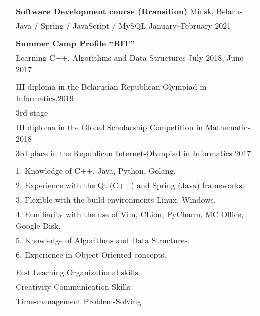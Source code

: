 \documentclass[letterpaper, 11pt]{article}
\begin{document}
\begin{longtable}{p{1.3in}p{4.8in}}
{\color{OliveGreen}{Additional}}
& \textbf{Software Development course (Itransition)} \hfill Minsk, Belarus\\
{\color{OliveGreen}{Education}} 
& Java / Spring / JavaScript / MySQL \hfill January--February 2021\\
& \\

& \textbf{Summer Camp Profile “BIT”} \\
& Learning C++, Algorithms and Data Structures \hfill July 2018, June 2017 \\
& \\



{\color{OliveGreen}{Aware and}} 
& III diploma in the Belarusian Republican Olympiad in Informatics,\hfill 2019\\
{\color{OliveGreen}{achievements}} 
& 3rd stage \\
& III diploma in the Global Scholarship Competition in Mathematics \hfill 2018\\
& 3rd place in the Republican Internet-Olympiad in Informatics  \hfill 2017\\
& \\

\nohyphens{\color{OliveGreen}{Technical skills}}
& 1. Knowledge of C++, Java, Python, Golang. \\
& 2. Experience with the Qt (C++) and Spring (Java) frameworks. \\
& 3. Flexible with the build environments Linux, Windows. \\
& 4. Familiarity with the use of Vim, CLion, PyCharm, MC Office, Google Disk. \\
& 5. Knowledge of Algorithms and Data Structures. \\
& 6. Experience in Object Oriented concepts. \\
& \\


\nohyphens{\color{OliveGreen}{Soft skills}} 
& Fast Learning \hfill Organizational skills \\
& Creativity \hfill Communication Skills \\
& Time-management \hfill Problem-Solving \\
& \\


\end{longtable}
\end{document}
